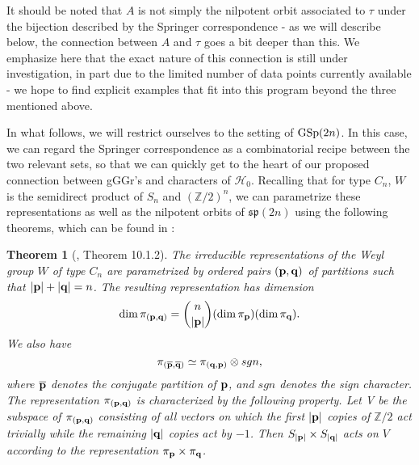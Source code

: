 \documentclass[11pt,letterpaper]{article}
\newcommand{\Z}{\mathbb{Z}}
\newcommand{\calH}{\mathcal{H}} %
\newcommand{\calO}{\mathcal{O}} %
\newcommand{\goth}{\mathfrak}
\newcommand{\GSp}{\textup{GSp}}
\renewcommand{\sp}{\goth{sp}}
\newtheorem{Theorem}{Theorem}[section]
\theoremstyle{remark}
\numberwithin{equation}{section}
\begin{document}
It should be noted that $A$ is not simply the nilpotent orbit associated to $\tau$ under the bijection described by the Springer correspondence - as we will describe below, the connection between $A$ and $\tau$ goes a bit deeper than this. We emphasize here that the exact nature of this connection is still under investigation, in part due to the limited number of data points currently available - we hope to find explicit examples that fit into this program beyond the three mentioned above. 



In what follows, we will restrict ourselves to the setting of $\GSp(2n)$. In this case, we can regard the Springer correspondence as a combinatorial recipe between the two relevant sets, so that we can quickly get to the heart of our proposed connection between gGGr's and characters of $\calH_0$.  Recalling that for type $C_n$, $W$ is the semidirect product of $S_n$ and $(\Z/2)^n$, we can parametrize these representations as well as the nilpotent orbits of $\sp(2n)$ using the following theorems, which can be found in \cite{CM}:


\begin{Theorem}[\cite{CM}, Theorem 10.1.2]
The irreducible representations of the Weyl group $W$ of type $C_n$ are parametrized by ordered pairs $({\bf p},{\bf q})$ of partitions such that $|{\bf p}| + |{\bf q}| = n$. The resulting representation has dimension $$\dim\pi_{({\bf p},{\bf q})} = {n \choose |{\bf p}|}(\dim \pi_{{\bf p}})(\dim \pi_{{\bf q}}).$$ We also have $$\pi_{(\overline{{\bf p}},\overline{{\bf q}})} \simeq \pi_{({\bf q},{\bf p})} \otimes sgn,$$ where $\overline{{\bf p}}$ denotes the conjugate partition of ${\bf p}$, and $sgn$ denotes the sign character. The representation $\pi_{({\bf p},{\bf q})}$ is characterized by the following property. Let V be the subspace of $\pi_{({\bf p},{\bf q})}$ consisting of all vectors on which the first $|{\bf p}|$ copies of $\Z/2$ act trivially while the remaining $|{\bf q}|$ copies act by $-1$. Then $S_{|{\bf p}|} \times S_{|{\bf q}|}$ acts on $V$ according to the representation $\pi_{{\bf p}}\times \pi_{{\bf q}}$.
\end{Theorem}
\end{document}
